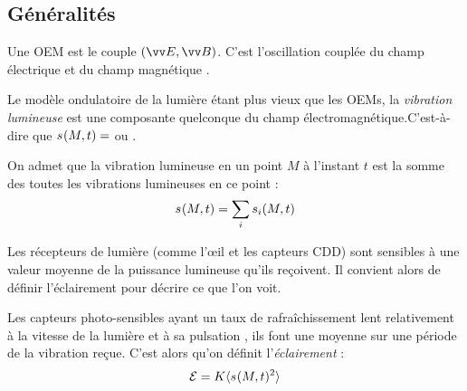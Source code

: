 \documentclass[11pt,a4paper,fleqn,pdftex]{report}
\begin{document}
\subsection{Généralités} %
\label{sub:generalites_optique}
\begin{dfn}
   Une \gls{OEM} est le couple $(\E , \B )$. C'est l'oscillation couplée du champ électrique \E{} et du champ magnétique \B{}. 
\end{dfn}
\begin{dfn}
   Le modèle ondulatoire de la lumière étant plus vieux que les \glspl{OEM}, la \emph{vibration lumineuse} \vibration{} est une composante quelconque du champ électromagnétique.\newline C'est-à-dire que $\vibration =$ \E{} ou \B{}.
\end{dfn}
\begin{theorem}[Superposition]
   On admet que la vibration lumineuse en un point $M$ à l'instant $t$ est la somme des toutes les vibrations lumineuses en ce point :
   \begin{equation}
   \vibration = \sum_i \vibration[i]
   \end{equation}
\end{theorem}
Les récepteurs de lumière (comme l'\oe{}il et les capteurs CDD) sont sensibles à une valeur moyenne de la puissance lumineuse qu'ils reçoivent. Il convient alors de définir l'éclairement pour décrire ce que l'on voit.
\begin{dfn}[Éclairement]
Les capteurs photo-sensibles ayant un taux de rafraîchissement lent relativement à la vitesse de la lumière et à sa pulsation \pulsation{}, ils font une moyenne sur une période de la vibration reçue. C'est alors qu'on définit l'\emph{éclairement} : 
\begin{equation}\label{eclairement}
\Epsilon = K \langle \vibration^2 \rangle
\end{equation}
\end{dfn}
\end{document}
